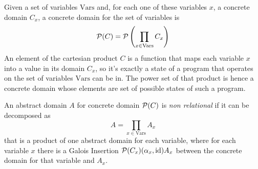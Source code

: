 Given a set of variables $\text{Vars}$ and, for each one of these variables $x$, a concrete domain $C_x$, a concrete domain for the set of variables is
\[
\mathcal{P}(C) = \mathcal{P}\left(\prod\limits_{x \in \text{Vars}} C_x \right)
\]
An element of the cartesian product $C$ is a function that maps each variable $x$ into a value in its domain $C_x$, so it's exactly a state of a program that operates on the set of variables $\text{Vars}$ can be in. The power set of that product is hence a concrete domain whose elements are set of possible states of such a program.

\begin{definition}
	An abstract domain $A$ for concrete domain $\mathcal{P}(C)$ is \textit{non relational} if it can be decomposed as
	\[
	A = \prod\limits_{x \in \text{Vars}} A_x
	\]
	that is a product of one abstract domain for each variable, where for each variable $x$ there is a Galois Insertion $\mathcal{P}(C_x) (\alpha_x, \text{id}) A_x$ between the concrete domain for that variable and $A_x$.
\end{definition}

